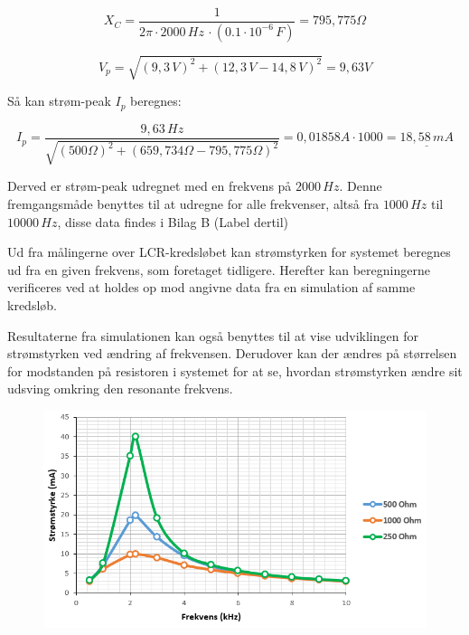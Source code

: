 \begin{equation*}
X_C = \frac{1}{2\pi \cdot 2000 \, Hz \, \cdot (0.1 \cdot 10^{-6} \, F)} = 795,775 \Omega
\end{equation*}

\begin{equation*}
V_p = \sqrt{(9,3 \, V)^2 + (12,3 \, V - 14,8 \, V)^2} = 9,63 V
\end{equation*}

Så kan strøm-peak $I_p$ beregnes:

\begin{equation*}
I_p = \frac{9,63 \, Hz}{\sqrt{(500 \Omega)^2 + (659,734\Omega-795,775\Omega)^2}} = 0,01858 A \cdot 1000 = \underline{18,58 \, mA}
\end{equation*}

Derved er strøm-peak udregnet med en frekvens på $2000 \, Hz$. Denne fremgangsmåde benyttes til at udregne for alle frekvenser, altså fra $1000 \, Hz$ til $10000 \, Hz$, disse data findes i Bilag B (Label dertil)

Ud fra målingerne over LCR-kredsløbet kan strømstyrken for systemet beregnes ud fra en given frekvens, som foretaget tidligere. Herefter kan beregningerne verificeres ved at holdes op mod angivne data fra en simulation af samme kredsløb.

Resultaterne fra simulationen kan også benyttes til at vise udviklingen for strømstyrken ved ændring af frekvensen. Derudover kan der ændres på størrelsen for modstanden på resistoren i systemet for at se, hvordan strømstyrken ændre sit udsving omkring den resonante frekvens.

\begin{figure}[H]
\centering
\includegraphics[scale=0.75]{Vildledning/Schematics/Graf_forsg1}
\caption{}
\label{figure:forsg1}
\end{figure}

